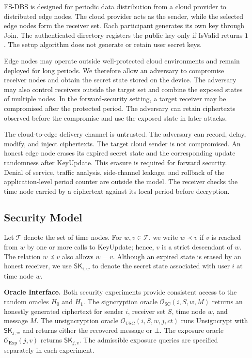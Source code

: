\documentclass[sigconf,anonymous]{acmart}
\theoremstyle{definition}
\theoremstyle{definition}
\theoremstyle{definition}
\theoremstyle{definition}
\theoremstyle{definition}
\theoremstyle{definition}
\theoremstyle{definition}
\theoremstyle{definition}
\theoremstyle{definition}
\begin{document}
FS-DBS is designed for periodic data distribution from a cloud provider to distributed edge nodes. The cloud provider acts as the sender, while the selected edge nodes form the receiver set. Each participant generates its own key through \textsf{Join}. The authenticated directory registers the public key only if \textsf{IsValid} returns $1$. The setup algorithm does not generate or retain user secret keys.

Edge nodes may operate outside well-protected cloud environments and remain deployed for long periods. We therefore allow an adversary to compromise receiver nodes and obtain the secret state stored on the device. The adversary may also control receivers outside the target set and combine the exposed states of multiple nodes. In the forward-security setting, a target receiver may be compromised after the protected period. The adversary can retain ciphertexts observed before the compromise and use the exposed state in later attacks.

The cloud-to-edge delivery channel is untrusted. The adversary can record, delay, modify, and inject ciphertexts. The target cloud sender is not compromised. An honest edge node erases its expired secret state and the corresponding update randomness after \textsf{KeyUpdate}. This erasure is required for forward security. Denial of service, traffic analysis, side-channel leakage, and rollback of the application-level period counter are outside the model. The receiver checks the time node carried by a ciphertext against its local period before decryption.

\subsection{Security Model}

Let $\mathcal{T}$ denote the set of time nodes. For $w,v\in\mathcal{T}$, we write $w\prec v$ if $v$ is reached from $w$ by one or more calls to \textsf{KeyUpdate}; hence, $v$ is a strict descendant of $w$. The relation $w\preceq v$ also allows $w=v$. Although an expired state is erased by an honest receiver, we use $\mathsf{SK}_{i,w}$ to denote the secret state associated with user $i$ at time node $w$.

\noindent\textbf{Oracle Interface.}
Both security experiments provide consistent access to the random oracles $H_0$ and $H_1$. The signcryption oracle $\mathcal{O}_{\mathrm{SC}}(i,S,w,M)$ returns an honestly generated ciphertext for sender $i$, receiver set $S$, time node $w$, and message $M$. The unsigncryption oracle $\mathcal{O}_{\mathrm{USC}}(i,S,w,j,ct)$ runs \textsf{Unsigncrypt} with $\mathsf{SK}_{j,w}$ and returns either the recovered message or $\bot$. The exposure oracle $\mathcal{O}_{\mathrm{Exp}}(j,v)$ returns $\mathsf{SK}_{j,v}$. The admissible exposure queries are specified separately in each experiment.
\end{document}
